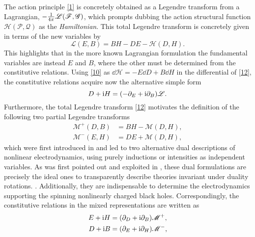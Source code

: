 The action principle \eqref{1} is concretely obtained as a Legendre transform from a Lagrangian, $-\frac{1}{4\pi }\mathscr{L}(\mathscr{F},\mathscr{G})$, which prompts dubbing the action structural function $\mathscr{H}(\mathscr{P},\mathscr{Q})$ as the \textit{Hamiltonian}. This total Legendre transform is concretely given in terms of the new variables by
\begin{equation}\label{12}
  \mathscr{L}(E,B)=BH-DE-\mathscr{H}(D,H).
\end{equation}
This highlights that in the more known Lagrangian formulation the fundamental variables are instead $E$ and $B$, where the other must be determined from the constitutive relations. Using \eqref{10} as $\dd\mathscr{H}=-E\dd D+B\dd H$ in the differential of \eqref{12}, the constitutive relations acquire now the alternative simple form
\begin{equation}\label{13}
  D+\mathrm{i} H=(-\partial_E+\mathrm{i} \partial_B)\mathscr{L}.
\end{equation}
Furthermore, the total Legendre transform \eqref{12} motivates the definition of the following two partial Legendre transforms
\begin{subequations}
	\begin{align}
  \mathscr{M}^+(D,B)&=BH-\mathscr{M}(D,H),\\
  \mathscr{M}^-(E,H)&=DE+\mathscr{M}(D,H),
\end{align}
\end{subequations}
which were first introduced in \cite{Salazar:1987ap} and led to two alternative dual descriptions of nonlinear electrodynamics, using purely inductions or intensities as independent variables. As was first pointed out and exploited in \cite{Salazar:1987ap}, these dual formulations are precisely the ideal ones to transparently describe theories invariant under duality rotations. . Additionally, they are indispensable to determine the electrodynamics supporting the spinning nonlinearly charged black holes. Correspondingly, the constitutive relations in the mixed representations are written as
\begin{subequations}\label{15}
	\begin{align}
  E+\mathrm{i} H&=(\partial_D +\mathrm{i} \partial_B)\mathscr{M}^+,\\
  D+\mathrm{i} B&=(\partial_E+\mathrm{i} \partial_H)\mathscr{M}^-,
\end{align}
\end{subequations}

























